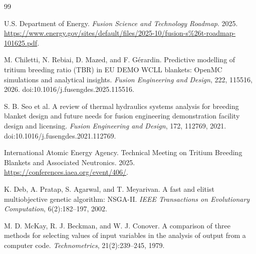 \documentclass[11pt]{article}
\begin{document}
\begin{thebibliography}{99}

U.S. Department of Energy.
\textit{Fusion Science and Technology Roadmap}. 2025.
\url{https://www.energy.gov/sites/default/files/2025-10/fusion-s%26t-roadmap-101625.pdf}.

M. Chiletti, N. Rebiai, D. Mazed, and F. G\'erardin.
Predictive modelling of tritium breeding ratio (TBR) in EU DEMO WCLL blankets: OpenMC
simulations and analytical insights.
\textit{Fusion Engineering and Design}, 222, 115516, 2026.
doi:10.1016/j.fusengdes.2025.115516.

S. B. Seo et al.
A review of thermal hydraulics systems analysis for breeding blanket design and future needs
for fusion engineering demonstration facility design and licensing.
\textit{Fusion Engineering and Design}, 172, 112769, 2021.
doi:10.1016/j.fusengdes.2021.112769.

International Atomic Energy Agency.
Technical Meeting on Tritium Breeding Blankets and Associated Neutronics. 2025.
\url{https://conferences.iaea.org/event/406/}.

K. Deb, A. Pratap, S. Agarwal, and T. Meyarivan.
A fast and elitist multiobjective genetic algorithm: NSGA-II.
\textit{IEEE Transactions on Evolutionary Computation}, 6(2):182--197, 2002.

M. D. McKay, R. J. Beckman, and W. J. Conover.
A comparison of three methods for selecting values of input variables in the analysis of
output from a computer code.
\textit{Technometrics}, 21(2):239--245, 1979.

\end{thebibliography}
\end{document}
